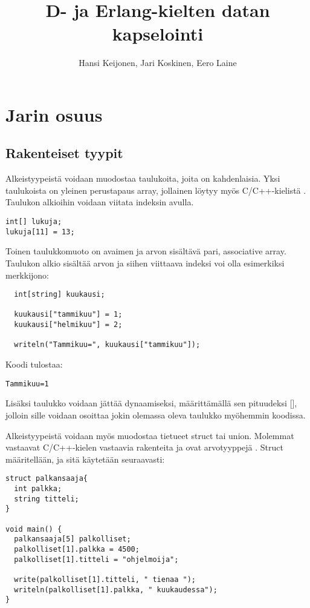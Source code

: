 \documentclass[11pt,oneside,a4paper]{article}
\title{D- ja Erlang-kielten datan kapselointi}
\author{Hansi Keijonen, Jari Koskinen, Eero Laine}
\begin{document}
\maketitle

\newpage

\section{Jarin osuus}
\subsection{Rakenteiset tyypit}
Alkeistyypeistä voidaan muodostaa taulukoita, joita on kahdenlaisia. Yksi
taulukoista on yleinen perustapaus array, jollainen löytyy myös C/C++-kielistä
\cite{KRR88}. Taulukon alkioihin voidaan viitata indeksin avulla.
\begin{verbatim}
int[] lukuja;
lukuja[11] = 13;
\end{verbatim}

Toinen taulukkomuoto on avaimen ja arvon sisältävä pari, associative array.
Taulukon alkio sisältää arvon ja siihen viittaava indeksi voi olla esimerkiksi
merkkijono: 
\begin{verbatim}
  int[string] kuukausi;
  
  kuukausi["tammikuu"] = 1;
  kuukausi["helmikuu"] = 2;
  
  writeln("Tammikuu=", kuukausi["tammikuu"]);
\end{verbatim}
Koodi tulostaa:
\begin{verbatim}
Tammikuu=1
\end{verbatim}

Lisäksi taulukko voidaan jättää dynaamiseksi, määrittämällä sen pituudeksi [],
jolloin sille voidaan osoittaa jokin olemassa oleva taulukko myöhemmin koodissa.

Alkeistyypeistä voidaan myös muodostaa tietueet struct tai union. Molemmat
vastaavat C/C++-kielen vastaavia rakenteita \cite{KRR88} ja ovat arvotyyppejä
\cite{DLA13}. Struct määritellään, ja sitä käytetään seuraavasti:

\begin{verbatim}
struct palkansaaja{
  int palkka;
  string titteli;
}

void main() {
  palkansaaja[5] palkolliset;
  palkolliset[1].palkka = 4500;
  palkolliset[1].titteli = "ohjelmoija";

  write(palkolliset[1].titteli, " tienaa ");
  writeln(palkolliset[1].palkka, " kuukaudessa");
}
\end{verbatim}
\end{document}
